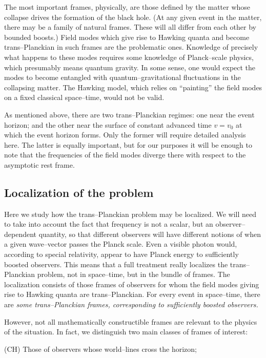 The most important frames, physically, are those defined by the matter
whose collapse drives the formation of the black hole.  (At any given
event in the matter, there may be a family of natural frames.  These
will all differ from each other by bounded boosts.)  Field modes which
give rise to Hawking quanta and become trans--Planckian in such frames
are the problematic ones.  Knowledge of precisely what happens to
these modes requires some knowledge of Planck--scale physics, which
presumably means quantum gravity.  In some sense, one would expect the
modes to become entangled with quantum--gravitational fluctuations in
the collapsing matter.  The Hawking model, which relies on
``painting'' the field modes on a fixed classical space--time, would
not be valid.

As mentioned above, there are two trans--Planckian regimes:  one near
the event horizon; and the other near the surface of constant advanced
time $v=v_0$ at which the event horizon forms.  Only the former will
require detailed analysis here.  The latter is equally important, but
for our purposes it will be enough to note that the frequencies of the
field modes diverge there with respect to the asymptotic rest frame.

\subsection{Localization of the problem}

Here we study how the trans--Planckian problem may be localized.
We will need
to take into account the fact that
frequency is not a scalar,
but an observer--dependent quantity, so that different observers will
have different notions of when a given wave--vector passes the Planck
scale.  Even a visible photon would, according to special relativity,
appear to have Planck energy to sufficiently boosted observers.  This
means that a full treatment really localizes the trans--Planckian
problem, not in space--time, but in the bundle of frames.  The
localization consists of those frames of observers for whom the
field modes giving rise to Hawking quanta are trans--Planckian.
For every event in space--time, there are \it some \rm
trans--Planckian frames, corresponding to sufficiently boosted
observers.

However, not all mathematically constructible frames are relevant to
the physics of the situation.  In fact, we distinguish two main
classes of
frames of interest:

\itemitem{} (CH) Those of observers whose world--lines 
cross the horizon;

